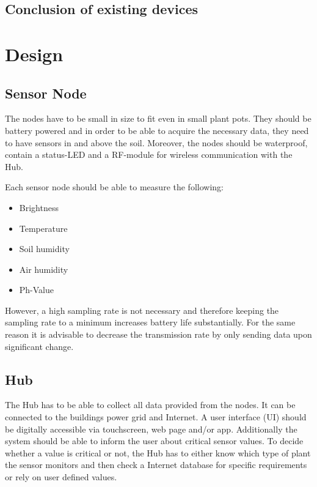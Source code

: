 \documentclass[conference]{IEEEtran}
\begin{document}
\subsection{Conclusion of existing devices}



\section{Design}
\subsection{Sensor Node}
The nodes have to be small in size to fit even in small plant pots. They should be battery powered and in order to be able to acquire the necessary data, they need to have sensors in and above the soil. Moreover, the nodes should be waterproof, contain a status-LED and a RF-module for wireless communication with the Hub.

Each sensor node should be able to measure the following:
\begin{itemize}
	\item Brightness
	\item Temperature
	\item Soil humidity
	\item Air humidity
	\item Ph-Value
\end{itemize}
However, a high sampling rate is not necessary and therefore keeping the sampling rate to a minimum increases battery life substantially. For the same reason it is advisable to decrease the transmission rate by only sending data upon significant change.

\subsection{Hub}
The Hub has to be able to collect all data provided from the nodes. It can be connected to the buildings power grid and Internet. A user interface (UI) should be digitally accessible via touchscreen, web page and/or app. Additionally the system should be able to inform the user about critical sensor values. To decide whether a value is critical or not, the Hub has to either know which type of plant the sensor monitors and then check a Internet database for specific requirements or rely on user defined values.


\end{document}
